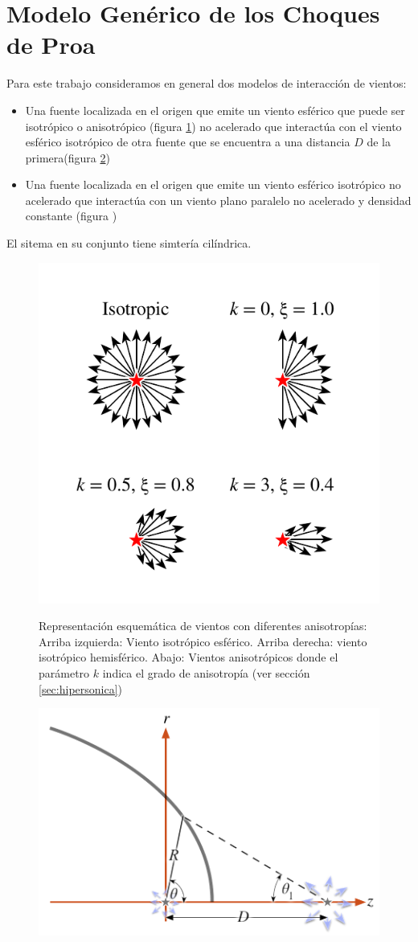 \section{Modelo Genérico de los Choques de Proa}
\label{sec:Modelo-generico}
Para este trabajo consideramos en general dos modelos de
interacción  de vientos:
\begin{itemize}
\item Una fuente localizada en el origen que emite un viento esférico
  que puede ser isotrópico o anisotrópico (figura
  \ref{fig:isotropic-aniso}) no acelerado que interactúa con el viento
  esférico isotrópico de otra fuente que se encuentra a una distancia
  $D$ de la primera(figura \ref{fig:crw-esquema})
\item Una fuente localizada en el origen que emite un viento esférico
  isotrópico no acelerado que interactúa con un viento plano paralelo
  no acelerado y densidad constante (figura )
\end{itemize}
El sitema en su conjunto tiene simtería cilíndrica.
\begin{figure}
  \includegraphics[width=0.5\linewidth]{./Figures/anisotropic-arrows}
  \label{fig:isotropic-aniso}
  \caption{Representación esquemática de vientos con diferentes
    anisotropías:
    Arriba izquierda: Viento isotrópico esférico. Arriba derecha: viento
    isotrópico hemisférico. Abajo: Vientos anisotrópicos donde el
    parámetro $k$ indica el grado de anisotropía (ver sección
    \ref{sec:hipersonica})}
\end{figure}
\begin{figure}
  \includegraphics[width=0.5\linewidth]{./Figures/bowshock-crw-variables}
  \label{fig:crw-esquema}
\end{figure}

